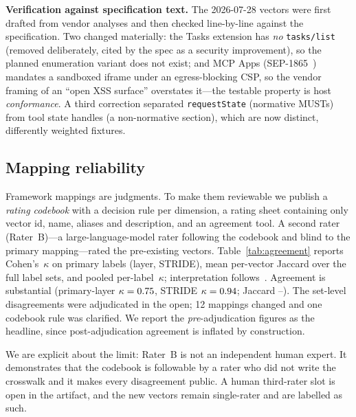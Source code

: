 \documentclass[conference]{IEEEtran}
\newcommand{\rev}{2026-07-28}
\begin{document}
\textbf{Verification against specification text.} The \rev{} vectors were first drafted from vendor analyses and then checked line-by-line against the specification. Two changed materially: the Tasks extension has \emph{no} \texttt{tasks/list} (removed deliberately, cited by the spec as a security improvement), so the planned enumeration variant does not exist; and MCP Apps (SEP-1865~\cite{sep1865}) mandates a sandboxed iframe under an egress-blocking CSP, so the vendor framing of an ``open XSS surface'' overstates it---the testable property is host \emph{conformance}. A third correction separated \texttt{requestState} (normative MUSTs) from tool state handles (a non-normative section), which are now distinct, differently weighted fixtures.

\begin{table}[t]
\caption{Vectors introduced by the \rev{} revision (\texttt{appliesTo:[\rev]}).}
\label{tab:new}
\centering\scriptsize
\resizebox{\columnwidth}{!}{}
\end{table}

\subsection{Mapping reliability}\label{sec:agreement}
Framework mappings are judgments. To make them reviewable we publish a \emph{rating codebook} with a decision rule per dimension, a rating sheet containing only vector id, name, aliases and description, and an agreement tool. A second rater (Rater~B)---a large-language-model rater following the codebook and blind to the primary mapping---rated the \nOrig{} pre-existing vectors. Table~\ref{tab:agreement} reports Cohen's~$\kappa$ on primary labels (layer, STRIDE), mean per-vector Jaccard over the full label sets, and pooled per-label~$\kappa$; interpretation follows~\cite{landiskoch1977}. Agreement is substantial (primary-layer $\kappa=0.75$, STRIDE $\kappa=0.94$; Jaccard \jacMin--\jacMax). The \nDisagree{} set-level disagreements were adjudicated in the open; 12 mappings changed and one codebook rule was clarified. We report the \emph{pre}-adjudication figures as the headline, since post-adjudication agreement is inflated by construction.

We are explicit about the limit: Rater~B is not an independent human expert. It demonstrates that the codebook is followable by a rater who did not write the crosswalk and it makes every disagreement public. A human third-rater slot is open in the artifact, and the \nNew{} new vectors remain single-rater and are labelled as such.
\end{document}
